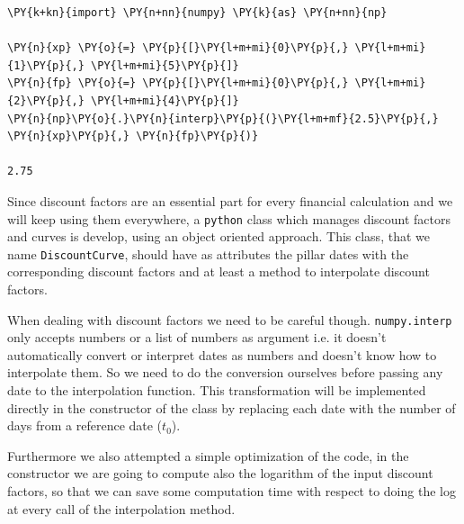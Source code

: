 \begin{codebox}
\begin{Verbatim}[commandchars=\\\{\}]
\PY{k+kn}{import} \PY{n+nn}{numpy} \PY{k}{as} \PY{n+nn}{np}

\PY{n}{xp} \PY{o}{=} \PY{p}{[}\PY{l+m+mi}{0}\PY{p}{,} \PY{l+m+mi}{1}\PY{p}{,} \PY{l+m+mi}{5}\PY{p}{]}
\PY{n}{fp} \PY{o}{=} \PY{p}{[}\PY{l+m+mi}{0}\PY{p}{,} \PY{l+m+mi}{2}\PY{p}{,} \PY{l+m+mi}{4}\PY{p}{]}
\PY{n}{np}\PY{o}{.}\PY{n}{interp}\PY{p}{(}\PY{l+m+mf}{2.5}\PY{p}{,} \PY{n}{xp}\PY{p}{,} \PY{n}{fp}\PY{p}{)}

2.75
\end{Verbatim}
\end{codebox}

Since discount factors are an essential part for every financial calculation and we will keep using them everywhere,
a \texttt{python} class which manages discount factors
and curves is develop, using an object
oriented approach.
This class, that we name \texttt{DiscountCurve}, should have as attributes the pillar dates with the corresponding discount factors and at least a method to interpolate discount factors.

When dealing with discount factors we need to be careful though. \texttt{numpy.interp} only 
accepts numbers or a list of numbers as argument i.e. it doesn't automatically convert or interpret dates as numbers and doesn't know how to interpolate them. So we need to do 
the conversion ourselves before passing any date to the interpolation function. This transformation will be implemented directly in the constructor of the class by replacing each date with
the number of days from a reference date ($t_0$).

Furthermore we also attempted a simple optimization of the code, in the constructor we are going to compute also the logarithm of the input discount factors, so that we can save
some computation time with respect to doing the log at every call of the interpolation method. 

